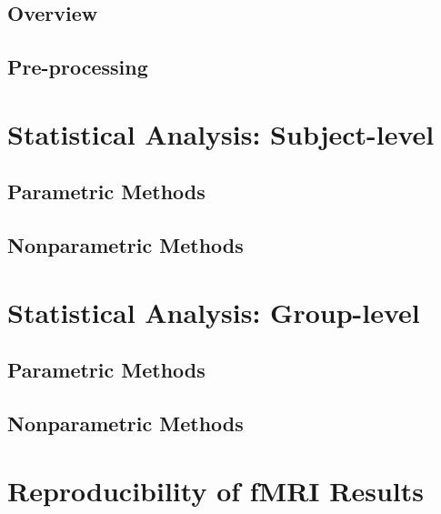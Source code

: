 \subsection{Overview}

\subsection{Pre-processing}

\section{Statistical Analysis: Subject-level}

\subsection{Parametric Methods}

\subsection{Nonparametric Methods}

\section{Statistical Analysis: Group-level}

\subsection{Parametric Methods}

\subsection{Nonparametric Methods}

\section{Reproducibility of fMRI Results}

